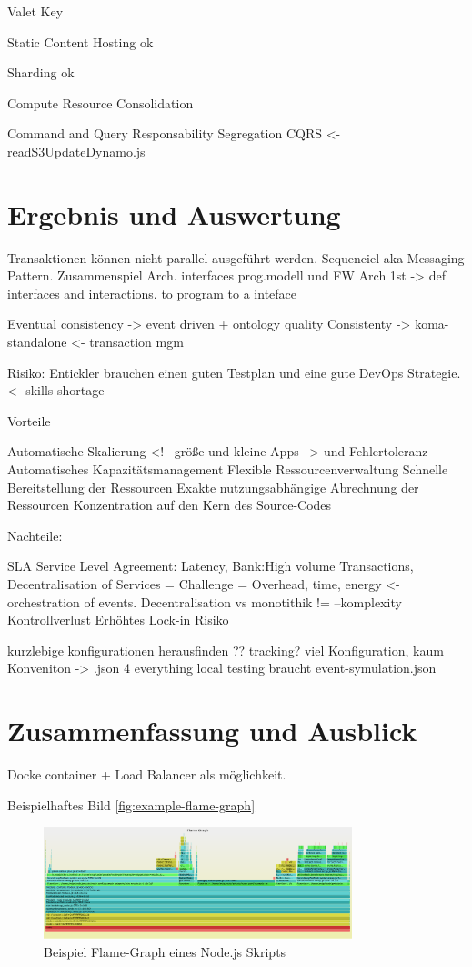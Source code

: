 \documentclass[
12pt,
english,
ngerman,
headsepline,
twoside,
openright,
numbers=noenddot,version=first
]{scrreprt}
\begin{document}
Valet Key \cite{homer2014cloud}

Static Content Hosting ok

Sharding ok

Compute Resource Consolidation

Command and Query Responsability Segregation CQRS <- readS3UpdateDynamo.js

\chapter{Ergebnis und Auswertung}
Transaktionen können nicht parallel ausgeführt werden. Sequenciel aka Messaging Pattern.
Zusammenspiel Arch. interfaces prog.modell und FW
Arch 1st -> def interfaces and interactions. to program to a inteface


Eventual consistency -> event driven + ontology quality
Consistenty -> koma-standalone <- transaction mgm

Risiko:
Entickler brauchen einen guten Testplan und eine gute DevOps Strategie.<- skills shortage

Vorteile

Automatische Skalierung <!-- größe und kleine Apps --> und Fehlertoleranz
Automatisches Kapazitätsmanagement
Flexible Ressourcenverwaltung
Schnelle Bereitstellung der Ressourcen
Exakte nutzungsabhängige Abrechnung der Ressourcen
Konzentration auf den Kern des Source-Codes

Nachteile:

SLA Service Level Agreement: Latency, Bank:High volume Transactions,
Decentralisation of Services = Challenge = Overhead, time, energy <- orchestration of events.
Decentralisation vs monotithik != --komplexity
Kontrollverlust
Erhöhtes Lock-in Risiko

kurzlebige konfigurationen herausfinden ?? tracking?
viel Konfiguration, kaum Konveniton -> .json 4 everything
local testing braucht event-symulation.json

\chapter{Zusammenfassung und Ausblick}

Docke container + Load Balancer
als möglichkeit.


Beispielhaftes Bild \autoref{fig:example-flame-graph}

\begin{figure}[h]
\centering
\includegraphics[width=0.8\textwidth]{pics/example-flame-graph.eps}
\caption{Beispiel Flame-Graph eines Node.js Skripts}
\label{fig:example-flame-graph}
\end{figure}
\end{document}
